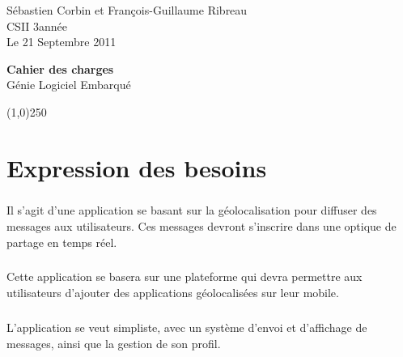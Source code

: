 \documentclass[a4paper,12pt]{report}
\begin{document}
  \begin{onehalfspace}

    \begin{titlepage}
      \begin{center}
        Sébastien Corbin et François-Guillaume Ribreau\\
        CSII 3\ieme année\\
    		Le 21 Septembre 2011\\
      \end{center}
      \hrulefill
      \vspace{7cm}
      \begin{center}
        \LARGE \textbf{Cahier des charges}\\
        \vspace{3cm}
        \normalsize Génie Logiciel Embarqué
      \end{center}

      \vspace{9,5cm}

      \begin{center}
      \line(1,0){250}
      \end{center}

      \begin{center}
      \tiny{\currfilename}
      \end{center}


    \end{titlepage}
    \clearpage

	\chapter*{Expression des besoins}
	
	\paragraph*{}
	Il s'agit d'une application se basant sur la géolocalisation pour diffuser des messages aux utilisateurs. Ces messages devront s'inscrire dans une optique de partage en temps réel.
	
	\paragraph*{}
	Cette application se basera sur une plateforme qui devra permettre aux utilisateurs d'ajouter des applications géolocalisées sur leur mobile.		

	\paragraph*{}
	L'application se veut simpliste, avec un système d'envoi et d'affichage de messages, ainsi que la gestion de son profil.
	

\end{onehalfspace}
\end{document}
